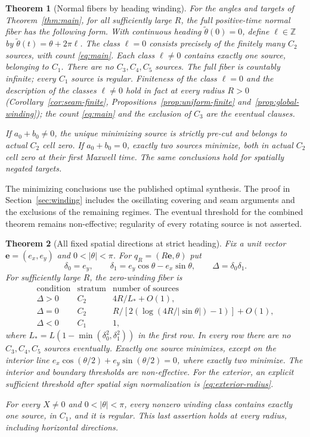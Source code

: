 \documentclass[11pt,a4paper]{article}
\newtheorem{theorem}{Theorem}[section]
\theoremstyle{remark}\newtheorem{remark}[theorem]{Remark}
\begin{document}
\begin{theorem}[Normal fibers by heading winding]\label{thm:winding}
For the angles and targets of Theorem~\ref{thm:main}, for all sufficiently
large $R$, the full positive-time normal fiber has the following form.
With continuous heading $\widetilde\theta(0)=0$, define
$\ell\in\mathbb Z$ by $\widetilde\theta(t)=\theta+2\pi\ell$.
The class $\ell=0$ consists precisely of the finitely many $C_2$ sources,
with count \eqref{eq:main}. Each class $\ell\ne0$ contains exactly one
source, belonging to $C_1$. There are no $C_3,C_4,C_5$ sources.
The full fiber is countably infinite; every $C_1$ source is regular.
Finiteness of the class $\ell=0$ and the description of the classes
$\ell\ne0$ hold in fact at every radius $R>0$
(Corollary~\ref{cor:seam-finite}, Propositions~\ref{prop:uniform-finite}
and~\ref{prop:global-winding}); the count \eqref{eq:main} and the
exclusion of $C_3$ are the eventual clauses.

If $a_0+b_0\ne0$, the unique minimizing source is strictly pre-cut and
belongs to actual $C_2$ cell zero. If $a_0+b_0=0$, exactly two sources
minimize, both in actual $C_2$ cell zero at their first Maxwell time.
The same conclusions hold for spatially negated targets.
\end{theorem}

The minimizing conclusions use the published optimal synthesis.
The proof in Section~\ref{sec:winding} includes the oscillating covering
and seam arguments and the exclusions of the remaining regimes.
The eventual threshold for the combined theorem remains non-effective;
regularity of every rotating source is not asserted.

\begin{theorem}[All fixed spatial directions at strict heading]\label{thm:directions}
Fix a unit vector $\mathbf e=(e_x,e_y)$ and $0<|\theta|<\pi$.
For $q_R=(R\mathbf e,\theta)$ put
\[
 \delta_0=e_y,\qquad \delta_1=e_y\cos\theta-e_x\sin\theta,\qquad
 \Delta=\delta_0\delta_1 .
\]
For sufficiently large $R$, the zero-winding fiber is
\[
\begin{array}{ccl}
\text{condition}&\text{stratum}&\text{number of sources}\\[2pt]
\Delta>0&C_2&4R/L_*+O(1),\\
\Delta=0&C_2&R/[2(\log(4R/|\sin\theta|)-1)]+O(1),\\
\Delta<0&C_1&1,
\end{array}
\]
where $L_*=L(1-\min(\delta_0^2,\delta_1^2))$ in the first row.
In every row there are no $C_3,C_4,C_5$ sources eventually.
Exactly one source minimizes, except on the interior line
$e_x\cos(\theta/2)+e_y\sin(\theta/2)=0$, where exactly two minimize.
The interior and boundary thresholds are non-effective. For the exterior,
an explicit sufficient threshold after spatial sign normalization is
\eqref{eq:exterior-radius}.

For every $X\ne0$ and $0<|\theta|<\pi$, every nonzero winding class
contains exactly one source, in $C_1$, and it is regular. This last
assertion holds at every radius, including horizontal directions.
\end{theorem}
\end{document}
